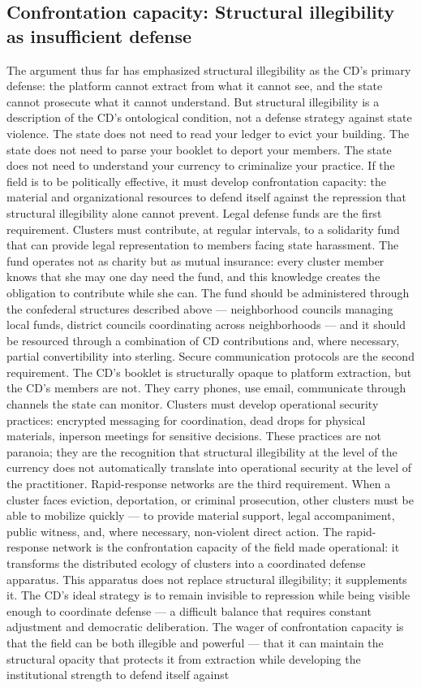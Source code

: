 \subsection{Confrontation capacity: Structural illegibility as insufficient defense}

The argument thus far has emphasized structural illegibility as the CD’s primary defense: the platform cannot extract from what it cannot see, and the state cannot prosecute what it cannot understand. But structural illegibility is a description of the CD’s ontological condition, not a defense strategy against state violence. The state does not need to read your ledger to evict your building. The state does not need to parse your booklet to deport your members. The state does not need to understand your currency to criminalize your practice. If the field is to be politically effective, it must develop confrontation capacity: the material and organizational resources to defend itself against the repression that structural illegibility alone cannot prevent. Legal defense funds are the first requirement. Clusters must contribute, at regular intervals, to a solidarity fund that can provide legal representation to members facing state harassment. The fund operates not as charity but as mutual insurance: every cluster member knows that she may one day need the fund, and this knowledge creates the obligation to contribute while she can. The fund should be administered through the confederal structures described above — neighborhood councils managing local funds, district councils coordinating across neighborhoods — and it should be resourced through a combination of CD contributions and, where necessary, partial convertibility into sterling. Secure communication protocols are the second requirement. The CD’s booklet is structurally opaque to platform extraction, but the CD’s members are not. They carry phones, use email, communicate through channels the state can monitor. Clusters must develop operational security practices: encrypted messaging for coordination, dead drops for physical materials, inperson meetings for sensitive decisions. These practices are not paranoia; they are the recognition that structural illegibility at the level of the currency does not automatically translate into operational security at the level of the practitioner. Rapid-response networks are the third requirement. When a cluster faces eviction, deportation, or criminal prosecution, other clusters must be able to mobilize quickly — to provide material support, legal accompaniment, public witness, and, where necessary, non-violent direct action. The rapid-response network is the confrontation capacity of the field made operational: it transforms the distributed ecology of clusters into a coordinated defense apparatus. This apparatus does not replace structural illegibility; it supplements it. The CD’s ideal strategy is to remain invisible to repression while being visible enough to coordinate defense — a difficult balance that requires constant adjustment and democratic deliberation. The wager of confrontation capacity is that the field can be both illegible and powerful — that it can maintain the structural opacity that protects it from extraction while developing the institutional strength to defend itself against 